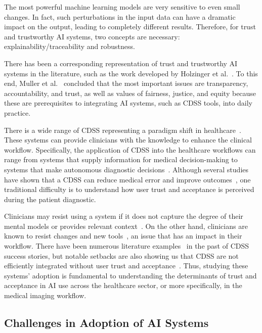The most powerful machine learning models are very sensitive to even small changes.
In fact, such perturbations in the input data can have a dramatic impact on the output, leading to completely different results.
Therefore, for trust and trustworthy AI systems, two concepts are necessary: explainability/traceability and robustness.

There has been a corresponding representation of trust and trustworthy AI systems in the literature, such as the work developed by Holzinger et al.~\cite{10.1007/978-3-030-93736-2_33}.
To this end, Muller et al.~\cite{9473208} concluded that the most important issues are transparency, accountability, and trust, as well as values of fairness, justice, and equity because these are prerequisites to integrating AI systems, such as CDSS tools, into daily practice.

There is a wide range of CDSS representing a paradigm shift in healthcare~\cite{Cai:2019:HTC:3290605.3300234, edge2019clinical}.
These systems can provide clinicians with the knowledge to enhance the clinical workflow.
Specifically, the application of CDSS into the healthcare workflows can range from systems that supply information for medical decision-making to systems that make autonomous diagnostic decisions~\cite{hwang2019artificial}.
Although several studies have shown that a CDSS can reduce medical error and improve outcomes~\cite{Cai:2019:EEE:3301275.3302289, Cai:2019:HTC:3290605.3300234}, one traditional difficulty is to understand how user trust and acceptance is perceived during the patient diagnostic.

Clinicians may resist using a system if it does not capture the degree of their mental models or provides relevant context~\cite{khairat2018reasons, kohli2018cad, yang2016investigating}.
On the other hand, clinicians are known to resist changes and new tools~\cite{calisto2017mimbcdui, 10.1145/3132272.3134111, gagnon2014electronic}, an issue that has an impact in their workflow.
There have been numerous literature examples~\cite{eslami2012effects, jia2016effects} in the past of CDSS success stories, but notable setbacks are also showing us that CDSS are not efficiently integrated without user trust and acceptance~\cite{Sutton2020}.
Thus, studying these systems' adoption is fundamental to understanding the determinants of trust and acceptance in AI use across the healthcare sector, or more specifically, in the medical imaging workflow.

\subsection{Challenges in Adoption of AI Systems}
\label{sec:chap004002002}

